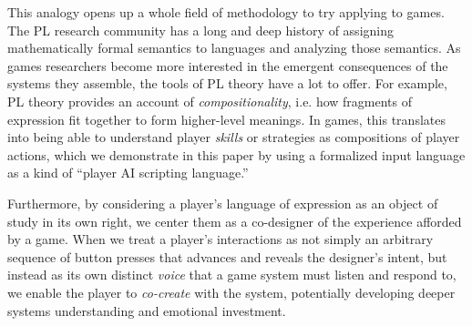 \documentclass[sigconf]{acmart}
\begin{document}

This analogy opens up a whole field of methodology to try applying to
games.  The PL research community has a long and deep
history of assigning mathematically formal semantics to languages and
analyzing those semantics. As games researchers become more interested in
the emergent consequences of the systems they assemble, the tools of PL
theory have a lot to offer. For example, PL theory provides an account of
{\em compositionality}, i.e. how fragments of expression fit together to
form higher-level meanings. In games, this translates into being able to
understand player {\em skills} or strategies as compositions of player
actions, which we demonstrate in this paper by using a formalized input
language as a kind of ``player AI scripting language.''




%
%


Furthermore, by considering a player's language of expression as an object
of study in its own right, we center them as a co-designer of the experience
afforded by a game. When we treat a player's interactions as not simply an
arbitrary sequence of button presses that advances and reveals the
designer's intent, but instead as its own distinct {\em voice} that a game
system must listen and respond to, we enable the player to {\em co-create}
with the system, potentially developing deeper systems understanding
and emotional investment.
\end{document}
